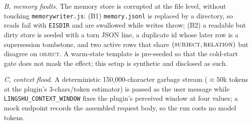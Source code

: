 \emph{B, memory faults.} The memory store is corrupted at the file level, without
touching \texttt{memorywriter.js}: (B1) \texttt{memory.jsonl} is replaced by a
directory, so reads fail with \texttt{EISDIR} and are swallowed while writes throw;
(B2) a readable but dirty store is seeded with a torn JSON line, a duplicate id
whose later row is a supersession tombstone, and two active rows that share
$(\textsc{subject},\textsc{relation})$ but disagree on \textsc{object}. A warm-state
template is pre-seeded so that the cold-start gate does not mask the effect; this
setup is synthetic and disclosed as such.

\emph{C, context flood.} A deterministic 150{,}000-character garbage stream
($\approx 50$k tokens at the plugin's 3-chars/token estimator) is passed as the
user message while \texttt{LINGSHU\_\allowbreak{}CONTEXT\_\allowbreak{}WINDOW} fixes the plugin's perceived
window at four values; a mock endpoint records the assembled request body, so the
run costs no model tokens.

